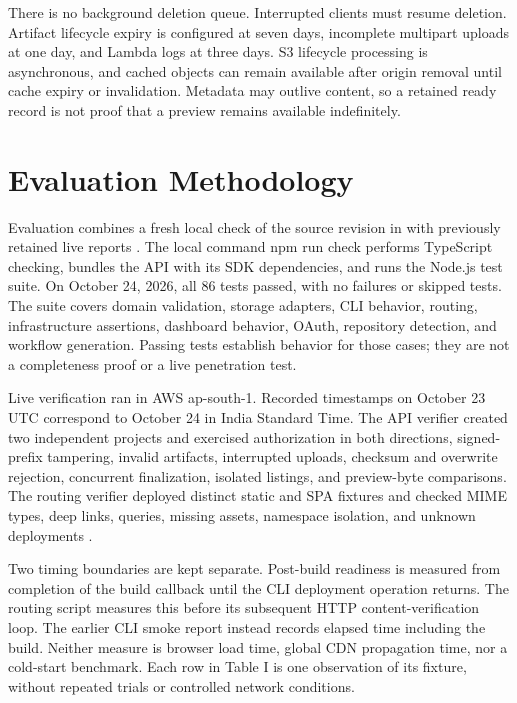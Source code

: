 \documentclass[conference,letterpaper]{IEEEtran}
\begin{document}
There is no background deletion queue. Interrupted clients must resume deletion. Artifact lifecycle expiry is configured at seven days, incomplete multipart uploads at one day, and Lambda logs at three days. S3 lifecycle processing is asynchronous, and cached objects can remain available after origin removal until cache expiry or invalidation. Metadata may outlive content, so a retained ready record is not proof that a preview remains available indefinitely.

\section{Evaluation Methodology}
Evaluation combines a fresh local check of the source revision in \cite{r1} with previously retained live reports \cite{r7}. The local command npm run check performs TypeScript checking, bundles the API with its SDK dependencies, and runs the Node.js test suite. On October 24, 2026, all 86 tests passed, with no failures or skipped tests. The suite covers domain validation, storage adapters, CLI behavior, routing, infrastructure assertions, dashboard behavior, OAuth, repository detection, and workflow generation. Passing tests establish behavior for those cases; they are not a completeness proof or a live penetration test.

Live verification ran in AWS ap-south-1. Recorded timestamps on October 23 UTC correspond to October 24 in India Standard Time. The API verifier created two independent projects and exercised authorization in both directions, signed-prefix tampering, invalid artifacts, interrupted uploads, checksum and overwrite rejection, concurrent finalization, isolated listings, and preview-byte comparisons. The routing verifier deployed distinct static and SPA fixtures and checked MIME types, deep links, queries, missing assets, namespace isolation, and unknown deployments \cite{r7}.

Two timing boundaries are kept separate. Post-build readiness is measured from completion of the build callback until the CLI deployment operation returns. The routing script measures this before its subsequent HTTP content-verification loop. The earlier CLI smoke report instead records elapsed time including the build. Neither measure is browser load time, global CDN propagation time, nor a cold-start benchmark. Each row in Table I is one observation of its fixture, without repeated trials or controlled network conditions.
\end{document}
